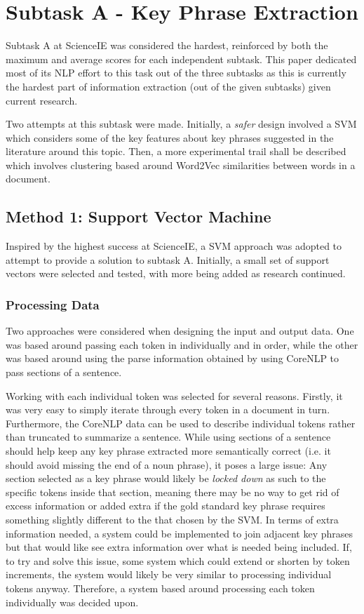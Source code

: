 \section{Subtask A - Key Phrase Extraction}
Subtask A at ScienceIE was considered the hardest, reinforced by both the maximum and average scores for each independent subtask. This paper dedicated most of its NLP effort to this task out of the three subtasks as this is currently the hardest part of information extraction (out of the given subtasks) given current research. 

Two attempts at this subtask were made. Initially, a \textit{safer} design involved a SVM which considers some of the key features about key phrases suggested in the literature around this topic. Then, a more experimental trail shall be described which involves clustering based around Word2Vec similarities between words in a document. 

\subsection{Method 1: Support Vector Machine}
Inspired by the highest success at ScienceIE, a SVM approach was adopted to attempt to provide a solution to subtask A. Initially, a small set of support vectors were selected and tested, with more being added as research continued.

\subsubsection*{Processing Data}
Two approaches were considered when designing the input and output data. One was based around passing each token in individually and in order, while the other was based around using the parse information obtained by using CoreNLP to pass sections of a sentence. 

Working with each individual token was selected for several reasons. Firstly, it was very easy to simply iterate through every token in a document in turn. Furthermore, the CoreNLP data can be used to describe individual tokens rather than truncated to summarize a sentence. While using sections of a sentence should help keep any key phrase extracted more semantically correct (i.e. it should avoid missing the end of a noun phrase), it poses a large issue: Any section selected as a key phrase would likely be \textit{locked down} as such to the specific tokens inside that section, meaning there may be no way to get rid of excess information or added extra if the gold standard key phrase requires something slightly different to the that chosen by the SVM. In terms of extra information needed, a system could be implemented to join adjacent key phrases but that would like see extra information over what is needed being included. If, to try and solve this issue, some system which could extend or shorten by token increments, the system would likely be very similar to processing individual tokens anyway. Therefore, a system based around processing each token individually was decided upon.

